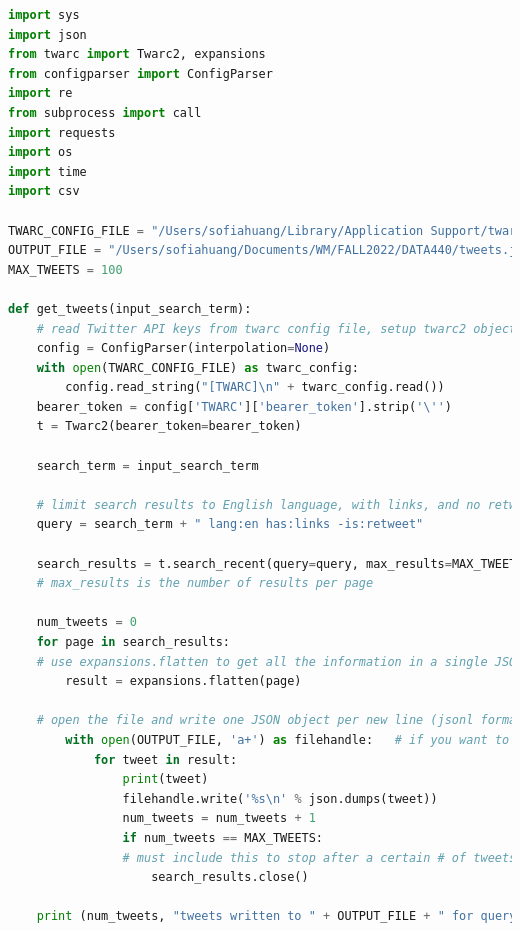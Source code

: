 \documentclass[12pt]{article}
\begin{document}
\begin{lstlisting}[language=Python, caption=Collecting tweets and extracting links, label=lst:copy]
import sys
import json
from twarc import Twarc2, expansions
from configparser import ConfigParser
import re
from subprocess import call
import requests
import os
import time
import csv

TWARC_CONFIG_FILE = "/Users/sofiahuang/Library/Application Support/twarc/config"
OUTPUT_FILE = "/Users/sofiahuang/Documents/WM/FALL2022/DATA440/tweets.jsonl"   # line-oriented JSON
MAX_TWEETS = 100

def get_tweets(input_search_term):
    # read Twitter API keys from twarc config file, setup twarc2 object
    config = ConfigParser(interpolation=None)
    with open(TWARC_CONFIG_FILE) as twarc_config:
        config.read_string("[TWARC]\n" + twarc_config.read())
    bearer_token = config['TWARC']['bearer_token'].strip('\'')
    t = Twarc2(bearer_token=bearer_token)

    search_term = input_search_term

    # limit search results to English language, with links, and no retweets
    query = search_term + " lang:en has:links -is:retweet"

    search_results = t.search_recent(query=query, max_results=MAX_TWEETS)
    # max_results is the number of results per page

    num_tweets = 0
    for page in search_results:
    # use expansions.flatten to get all the information in a single JSON
        result = expansions.flatten(page)

    # open the file and write one JSON object per new line (jsonl format)
        with open(OUTPUT_FILE, 'a+') as filehandle:   # if you want to append, change 'w' to 'a+'
            for tweet in result:
                print(tweet)
                filehandle.write('%s\n' % json.dumps(tweet))
                num_tweets = num_tweets + 1
                if num_tweets == MAX_TWEETS:
                # must include this to stop after a certain # of tweets
                    search_results.close()

    print (num_tweets, "tweets written to " + OUTPUT_FILE + " for query \"" + query + "\"\n");


\end{lstlisting}
\end{document}
